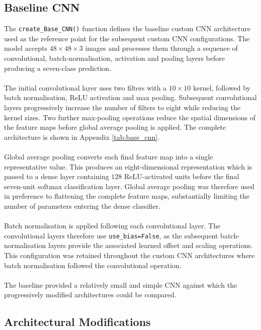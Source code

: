 \documentclass[12pt, a4paper]{report}
\let\oldsubsection\subsection
\renewcommand{\subsection}{%
    \Needspace{6\baselineskip}%
    \oldsubsection
}
\begin{document}
			\subsection{Baseline CNN}
				
				The \texttt{create\_Base\_CNN()} function defines the baseline custom CNN architecture used as the reference point for the subsequent custom CNN configurations. The model accepts $48 \times 48 \times 3$ images and processes them through a sequence of convolutional, batch-normalisation, activation and pooling layers before producing a seven-class prediction.\\\\
				The initial convolutional layer uses two filters with a $10 \times 10$ kernel, followed by batch normalisation, ReLU activation and max pooling. Subsequent convolutional layers progressively increase the number of filters to eight while reducing the kernel sizes. Two further max-pooling operations reduce the spatial dimensions of the feature maps before global average pooling is applied. The complete architecture is shown in Appendix \ref{tab:base_cnn}.\\\\
				Global average pooling converts each final feature map into a single representative value. This produces an eight-dimensional representation which is passed to a dense layer containing $128$ ReLU-activated units before the final seven-unit softmax classification layer. Global average pooling was therefore used in preference to flattening the complete feature maps, substantially limiting the number of parameters entering the dense classifier.\\\\
				Batch normalisation is applied following each convolutional layer. The convolutional layers therefore use \texttt{use\_bias=False}, as the subsequent batch-normalisation layers provide the associated learned offset and scaling operations. This configuration was retained throughout the custom CNN architectures where batch normalisation followed the convolutional operation.\\\\
				The baseline provided a relatively small and simple CNN against which the progressively modified architectures could be compared.
				
			\subsection{Architectural Modifications}
				
\end{document}
